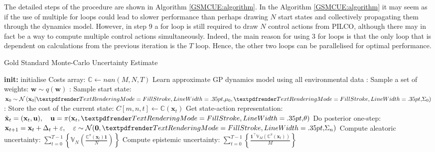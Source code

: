 The detailed steps of the procedure are shown in Algorithm \ref{GSMCUE:algorithm}. In the Algorithm \ref{GSMCUE:algorithm} it may seem as if the use of multiple for loops could lead to slower performance than perhaps drawing $N$ start states and collectively propagating them through the dynamics model. However, in step 9 a for loop is still required to draw $N$ control actions from PILCO, although there may in fact be a way to compute multiple control actions simultaneously. Indeed, the main reason for using 3 for loops is that the only loop that is dependent on calculations from the previous iteration is the $T$ loop. Hence, the other two loops can be parallelised for optimal performance.
\begin{algorithm}
\caption{Gold Standard Monte-Carlo Uncertainty Estimate}\label{GSMCUE:algorithm}
\begin{algorithmic}[1]
\State \textbf{init:} initialise Costs array: $\mathbb{C}\gets nan(M,N,T)$
\State Learn approximate GP dynamics model using all environmental data 
:
\State Sample a set of weights: $\mathbf{w}\sim q(\mathbf{w})$ 
:
\State Sample start state: $\mathbf{x}_{0} \sim \mathcal{N}\left(\mathbf{x}_{0} | \boldgreek{\mu}_{0}, \boldgreek{\Sigma}_{0}\right)$
:
\State Store the cost of the current state: $C[m,n,t]\gets \mathbb{C}(\mathbf{x}_{t})$  
\State Get state-action representation: $\tilde{\mathbf{x}}_{t}=(\mathbf{x}_{t},\mathbf{u}), \quad\mathbf{u}=\pi(\mathbf{x}_{t}, \boldgreek{\theta})$
\State Do posterior one-step: $\mathbf{x}_{t+1}=\mathbf{x}_{t}+\Delta_{t}+\varepsilon, \quad \varepsilon \sim \mathcal{N}(\mathbf{0},\boldgreek{\Sigma}_{n})$ 
\EndFor
\EndFor
\EndFor
\State Compute aleatoric uncertainty: $\sum^{T-1}_{t=0}\left\{\mathbb{V}_{N}\left(\frac{\mathbb{C}^{\pi}(\mathbf{x}_{t})\mathbf{1}}{N}\right)\right\}$
\State Compute epistemic uncertainty: $\sum^{T-1}_{t=0}\left\{\frac{\mathbf{1}^{\top}\mathbb{V}_{M}\left(\mathbb{C}^{\pi}(\mathbf{x}_{t})\right)}{M}\right\}$ 
\end{algorithmic}
\end{algorithm}
